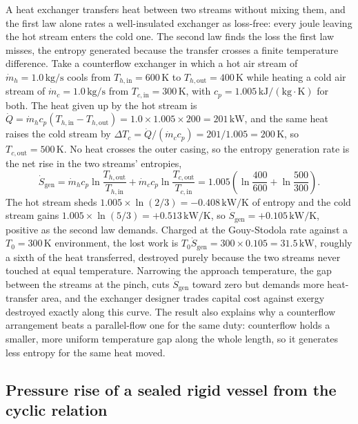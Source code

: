 A heat exchanger transfers heat between two streams without mixing them, and the
first law alone rates a well-insulated exchanger as loss-free: every joule
leaving the hot stream enters the cold one. The second law finds the loss the
first law misses, the entropy generated because the transfer crosses a finite
temperature difference. Take a counterflow exchanger in which a hot air stream of
$\dot m_h = 1.0\,\text{kg}/\text{s}$ cools from $T_{h,\text{in}} =
600\,\si{\kelvin}$ to $T_{h,\text{out}} = 400\,\si{\kelvin}$ while heating a cold
air stream of $\dot m_c = 1.0\,\text{kg}/\text{s}$ from $T_{c,\text{in}} =
300\,\si{\kelvin}$, with $c_p = 1.005\,\text{kJ}/(\text{kg}\cdot\si{\kelvin})$ for
both. The heat given up by the hot stream is $\dot Q = \dot m_h c_p(T_{h,\text{in}}
- T_{h,\text{out}}) = 1.0 \times 1.005 \times 200 = 201\,\text{kW}$, and the same
heat raises the cold stream by $\Delta T_c = \dot Q/(\dot m_c c_p) =
201/1.005 = 200\,\si{\kelvin}$, so $T_{c,\text{out}} = 500\,\si{\kelvin}$. No heat
crosses the outer casing, so the entropy generation rate is the net rise in the
two streams' entropies,
\[
\dot S_{\text{gen}} = \dot m_h c_p \ln\frac{T_{h,\text{out}}}{T_{h,\text{in}}}
+ \dot m_c c_p \ln\frac{T_{c,\text{out}}}{T_{c,\text{in}}}
= 1.005\!\left(\ln\frac{400}{600} + \ln\frac{500}{300}\right).
\]
The hot stream sheds $1.005 \times \ln(2/3) = -0.408\,\text{kW}/\si{\kelvin}$ of
entropy and the cold stream gains $1.005 \times \ln(5/3) =
+0.513\,\text{kW}/\si{\kelvin}$, so $\dot S_{\text{gen}} =
+0.105\,\text{kW}/\si{\kelvin}$, positive as the second law demands. Charged at
the Gouy-Stodola rate against a $T_0 = 300\,\si{\kelvin}$ environment, the lost
work is $T_0 \dot S_{\text{gen}} = 300 \times 0.105 = 31.5\,\text{kW}$, roughly a
sixth of the heat transferred, destroyed purely because the two streams never
touched at equal temperature. Narrowing the approach temperature, the gap between
the streams at the pinch, cuts $\dot S_{\text{gen}}$ toward zero but demands more
heat-transfer area, and the exchanger designer trades capital cost against exergy
destroyed exactly along this curve. The result also explains why a counterflow
arrangement beats a parallel-flow one for the same duty: counterflow holds a
smaller, more uniform temperature gap along the whole length, so it generates less
entropy for the same heat moved.

\subsection{Pressure rise of a sealed rigid vessel from the cyclic relation}

